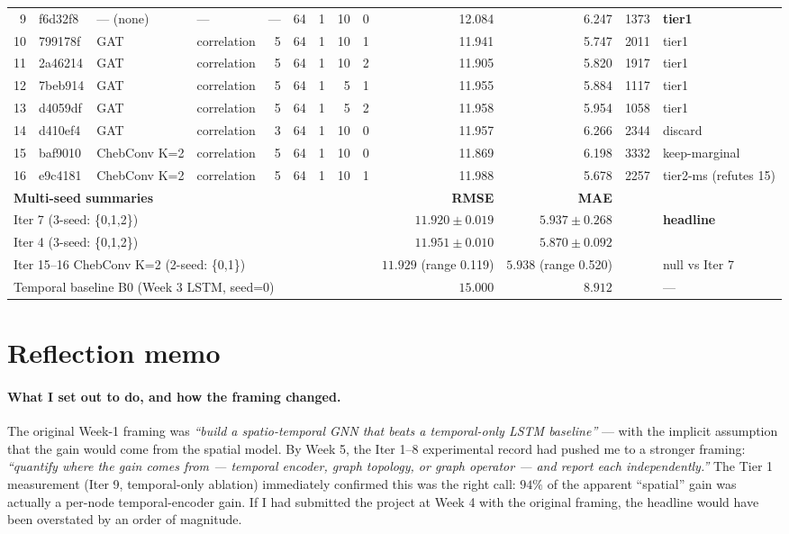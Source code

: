 \documentclass{article}
\begin{document}
\begin{table}[h]
{\begin{tabular}{rlllrrrrrrrrl}
9  & f6d32f8   & --- (none) & ---       & --- & 64 & 1 & 10 & 0 & 12.084 & 6.247  & 1373  & \textbf{tier1} \\
10 & 799178f   & GAT     & correlation & 5 & 64 & 1 & 10 & 1 & 11.941 & 5.747  & 2011  & tier1 \\
11 & 2a46214   & GAT     & correlation & 5 & 64 & 1 & 10 & 2 & 11.905 & 5.820  & 1917  & tier1 \\
12 & 7beb914   & GAT     & correlation & 5 & 64 & 1 & 5  & 1 & 11.955 & 5.884  & 1117  & tier1 \\
13 & d4059df   & GAT     & correlation & 5 & 64 & 1 & 5  & 2 & 11.958 & 5.954  & 1058  & tier1 \\
14 & d410ef4   & GAT     & correlation & 3 & 64 & 1 & 10 & 0 & 11.957 & 6.266  & 2344  & discard \\
15 & baf9010   & ChebConv K=2 & correlation & 5 & 64 & 1 & 10 & 0 & 11.869 & 6.198 & 3332 & keep-marginal \\
16 & e9c4181   & ChebConv K=2 & correlation & 5 & 64 & 1 & 10 & 1 & 11.988 & 5.678 & 2257 & tier2-ms (refutes 15) \\
\midrule
\multicolumn{9}{l}{\textbf{Multi-seed summaries}} & \textbf{RMSE} & \textbf{MAE} & & \\
\multicolumn{9}{l}{Iter 7 (3-seed: \{0,1,2\})} & $11.920 \pm 0.019$ & $5.937 \pm 0.268$ & & \textbf{headline} \\
\multicolumn{9}{l}{Iter 4 (3-seed: \{0,1,2\})} & $11.951 \pm 0.010$ & $5.870 \pm 0.092$ & & \\
\multicolumn{9}{l}{Iter 15--16 ChebConv K=2 (2-seed: \{0,1\})} & $11.929$ (range 0.119) & $5.938$ (range 0.520) & & null vs Iter 7 \\
\multicolumn{9}{l}{Temporal baseline B0 (Week 3 LSTM, seed=0)} & $15.000$ & $8.912$ & & --- \\
\bottomrule
\end{tabular}%
}
\end{table}

\section{Reflection memo}
\label{app:reflection}

\paragraph{What I set out to do, and how the framing changed.}
The original Week-1 framing was \emph{``build a spatio-temporal GNN that beats a temporal-only LSTM baseline''} --- with the implicit assumption that the gain would come from the spatial model. By Week 5, the Iter 1--8 experimental record had pushed me to a stronger framing: \emph{``quantify where the gain comes from --- temporal encoder, graph topology, or graph operator --- and report each independently.''} The Tier 1 measurement (Iter 9, temporal-only ablation) immediately confirmed this was the right call: $94\%$ of the apparent ``spatial'' gain was actually a per-node temporal-encoder gain. If I had submitted the project at Week 4 with the original framing, the headline would have been overstated by an order of magnitude.
\end{document}
